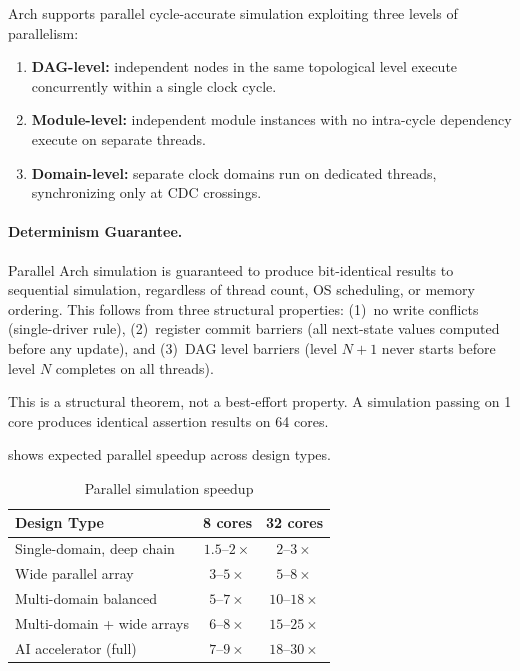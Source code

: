 \documentclass[11pt,twocolumn]{article}
\begin{document}
Arch supports parallel cycle-accurate simulation exploiting three levels of parallelism:

\begin{enumerate}
\item \textbf{DAG-level:} independent nodes in the same topological level execute concurrently within a single clock cycle.
\item \textbf{Module-level:} independent module instances with no intra-cycle dependency execute on separate threads.
\item \textbf{Domain-level:} separate clock domains run on dedicated threads, synchronizing only at CDC crossings.
\end{enumerate}

\paragraph{Determinism Guarantee.}
Parallel Arch simulation is guaranteed to produce bit-identical results to sequential simulation, regardless of thread count, OS scheduling, or memory ordering. This follows from three structural properties:
(1)~no write conflicts (single-driver rule),
(2)~register commit barriers (all next-state values computed before any update), and
(3)~DAG level barriers (level $N{+}1$ never starts before level $N$ completes on all threads).

This is a structural theorem, not a best-effort property. A simulation passing on 1 core produces identical assertion results on 64 cores.

 shows expected parallel speedup across design types.

\begin{table}[H]
\centering
\caption{Parallel simulation speedup}
\label{tab:scaling}
\small
\begin{tabular}{@{}lcc@{}}
\toprule
\textbf{Design Type} & \textbf{8 cores} & \textbf{32 cores} \\
\midrule
Single-domain, deep chain & $1.5$--$2\times$ & $2$--$3\times$ \\
Wide parallel array & $3$--$5\times$ & $5$--$8\times$ \\
Multi-domain balanced & $5$--$7\times$ & $10$--$18\times$ \\
Multi-domain + wide arrays & $6$--$8\times$ & $15$--$25\times$ \\
AI accelerator (full) & $7$--$9\times$ & $18$--$30\times$ \\
\bottomrule
\end{tabular}
\end{table}
\end{document}
